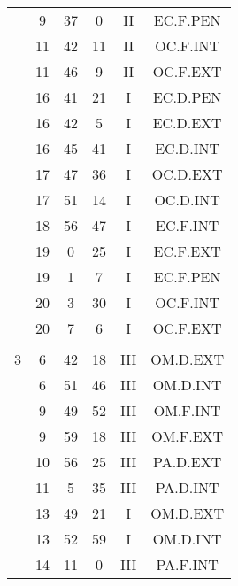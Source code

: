 \documentclass[12pt, a4paper]{article}
\begin{document}
\begin{multicols}{3}
{\begin{tabular}{c c c c c c}
	 	 	 	 & 9 & 37 & 0 & II & EC.F.PEN\\%
	 	 	 	 & 11 & 42 & 11 & II & OC.F.INT\\%
	 	 	 	 & 11 & 46 & 9 & II & OC.F.EXT\\%
	 	 	 	 & 16 & 41 & 21 & I & EC.D.PEN\\%
	 	 	 	 & 16 & 42 & 5 & I & EC.D.EXT\\%
	 	 	 	 & 16 & 45 & 41 & I & EC.D.INT\\%
	 	 	 	 & 17 & 47 & 36 & I & OC.D.EXT\\%
	 	 	 	 & 17 & 51 & 14 & I & OC.D.INT\\%
	 	 	 	 & 18 & 56 & 47 & I & EC.F.INT\\%
	 	 	 	 & 19 & 0 & 25 & I & EC.F.EXT\\%
	 	 	 	 & 19 & 1 & 7 & I & EC.F.PEN\\%
	 	 	 	 & 20 & 3 & 30 & I & OC.F.INT\\%
	 	 	 	 & 20 & 7 & 6 & I & OC.F.EXT\\%
	 	 	 	 & & & & & \\%
	 	 	 	3 & 6 & 42 & 18 & III & OM.D.EXT\\%
	 	 	 	 & 6 & 51 & 46 & III & OM.D.INT\\%
	 	 	 	 & 9 & 49 & 52 & III & OM.F.INT\\%
	 	 	 	 & 9 & 59 & 18 & III & OM.F.EXT\\%
	 	 	 	 & 10 & 56 & 25 & III & PA.D.EXT\\%
	 	 	 	 & 11 & 5 & 35 & III & PA.D.INT\\%
	 	 	 	 & 13 & 49 & 21 & I & OM.D.EXT\\%
	 	 	 	 & 13 & 52 & 59 & I & OM.D.INT\\%
	 	 	 	 & 14 & 11 & 0 & III & PA.F.INT\\%

\end{tabular}}
\end{multicols}
\end{document}
